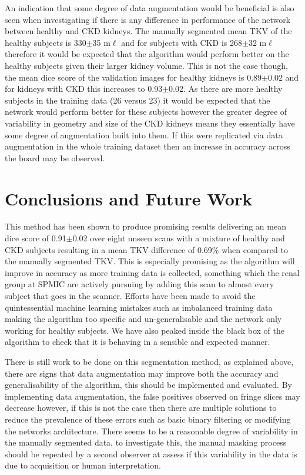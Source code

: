 An indication that some degree of data augmentation would be beneficial is also seen when investigating if there is any difference in performance of the network between healthy and \ac{CKD} kidneys. The manually segmented mean \ac{TKV} of the healthy subjects is 330$\pm$35 m$\ell$ and for subjects with \ac{CKD} is 268$\pm$32 m$\ell$ therefore it would be expected that the algorithm would perform better on the healthy subjects given their larger kidney volume. This is not the case though, the mean dice score of the validation images for healthy kidneys is 0.89$\pm$0.02 and for kidneys with \ac{CKD} this increases to 0.93$\pm$0.02. As there are more healthy subjects in the training data (26 versus 23) it would be expected that the network would perform better for these subjects however the greater degree of variability in geometry and size of the \ac{CKD} kidneys means they essentially have some degree of augmentation built into them. If this were replicated via data augmentation in the whole training dataset then an increase in accuracy across the board may be observed.

\newpage
\section{Conclusions and Future Work}

This method has been shown to produce promising results delivering an mean dice score of 0.91$\pm$0.02 over eight unseen scans with a mixture of healthy and \ac{CKD} subjects resulting in a mean \ac{TKV} difference of 0.69\% when compared to the manually segmented \ac{TKV}. This is especially promising as the algorithm will improve in accuracy as more training data is collected, something which the renal group at \ac{SPMIC} are actively pursuing by adding this scan to almost every subject that goes in the scanner. Efforts have been made to avoid the quintessential machine learning mistakes such as imbalanced training data making the algorithm too specific and un-generalisable and the network only working for healthy subjects. We have also peaked inside the black box of the algorithm to check that it is behaving in a sensible and expected manner.

There is still work to be done on this segmentation method, as explained above, there are signs that data augmentation may improve both the accuracy and generalisability of the algorithm, this should be implemented and evaluated. By implementing data augmentation, the false positives observed on fringe slices may decrease however, if this is not the case then there are multiple solutions to reduce the prevalence of these errors such as basic binary filtering or modifying the networks architecture. There seems to be a reasonable degree of variability in the manually segmented data, to investigate this, the manual masking process should be repeated by a second observer at assess if this variability in the data is due to acquisition or human interpretation.

